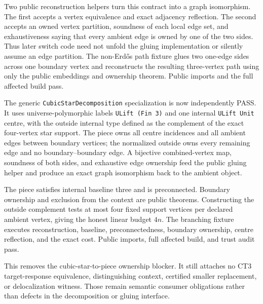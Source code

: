 \documentclass[11pt]{article}
\begin{document}
Two public reconstruction helpers turn this contract into a graph isomorphism.
The first accepts a vertex equivalence and exact adjacency reflection.  The
second accepts an owned vertex partition, soundness of each local edge set,
and exhaustiveness saying that every ambient edge is owned by one of the two
sides.  Thus later switch code need not unfold the gluing implementation or
silently assume an edge partition.  The non-Erdős path fixture glues two
one-edge sides across one boundary vertex and reconstructs the resulting
three-vertex path using only the public embeddings and ownership theorem.
Public imports and the full affected build pass.

The generic \texttt{CubicStarDecomposition} specialization is now
independently PASS.  It uses universe-polymorphic labels
\texttt{ULift (Fin 3)} and one internal \texttt{ULift Unit} centre, with the
outside internal type defined as the complement of the exact four-vertex star
support.  The piece owns all centre incidences and all ambient edges between
boundary vertices; the normalized outside owns every remaining edge and no
boundary--boundary edge.  A bijective combined-vertex map, soundness of both
sides, and exhaustive edge ownership feed the public gluing helper and produce
an exact graph isomorphism back to the ambient object.

The piece satisfies internal baseline three and is preconnected.  Boundary
ownership and exclusion from the context are public theorems.  Constructing
the outside complement tests at most four fixed support vertices per declared
ambient vertex, giving the honest linear budget $4n$.  The branching fixture
executes reconstruction, baseline, preconnectedness, boundary ownership,
centre reflection, and the exact cost.  Public imports, full affected build,
and trust audit pass.

This removes the cubic-star-to-piece ownership blocker.  It still attaches no
CT3 target-response equivalence, distinguishing context, certified smaller
replacement, or delocalization witness.  Those remain semantic consumer
obligations rather than defects in the decomposition or gluing interface.
\end{document}
